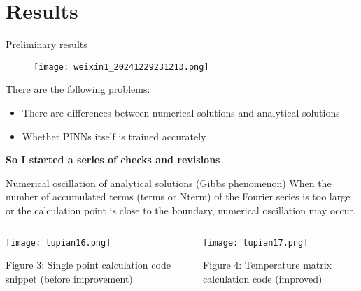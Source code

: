 \documentclass{beamer}
\begin{document}
\section{Results}
\begin{frame}{Preliminary results}
\begin{figure}[!htbp]
    \centering
    \texttt{[image: weixin1\_20241229231213.png]}
    \label{SJTU}
\end{figure}
There are the following problems: 
\begin{itemize}
    \item There are differences between numerical solutions and analytical solutions
    \item Whether PINNs itself is trained accurately
\end{itemize}
\centering \textbf{So I started a series of checks and revisions}
\end{frame}



\begin{frame}{Numerical oscillation of analytical solutions (Gibbs phenomenon)}
When the number of accumulated terms (terms or Nterm) of the Fourier series is too large or the calculation point is close to the boundary, numerical oscillation may occur.
    \begin{columns}[c] %
        \begin{column}{0.5\textwidth}
            \centering
            \texttt{[image: tupian16.png]} %
            \caption{\footnotesize Figure 3: Single point calculation code snippet (before improvement)} %
        \end{column}

        \begin{column}{0.5\textwidth}
            \centering
            \texttt{[image: tupian17.png]} %
            \caption{\footnotesize Figure 4: Temperature matrix calculation code (improved)} %
        \end{column}
    \end{columns}
\end{frame}
\end{document}
